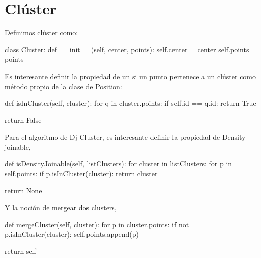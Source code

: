 \documentclass[a4paper, 12pt]{article}
\begin{document}
\section{Cl\'uster}

Definimos cl\'uster como:

\begin{python}
class Cluster:
    def __init__(self, center, points):
		self.center = center
        self.points = points
\end{python}

Es interesante definir la propiedad de un si un punto pertenece a un cl\'uster como m\'etodo propio de la clase de Position:

\begin{python}
def isInCluster(self, cluster):
	for q in cluster.points:
		if self.id == q.id:
			return True

	return False
\end{python}

Para el algoritmo de Dj-Cluster, es interesante definir la propiedad de Density joinable,

\begin{python}
def isDensityJoinable(self, listClusters):
	for cluster in listClusters:
    		for p in self.points:
        		if p.isInCluster(cluster):
            		return cluster

	return None
\end{python}

Y la noci\'on de mergear dos clusters,

\begin{python}
def mergeCluster(self, cluster):
	for p in cluster.points:
    		if not p.isInCluster(cluster):
        		self.points.append(p)

    return self
\end{python}
\end{document}

